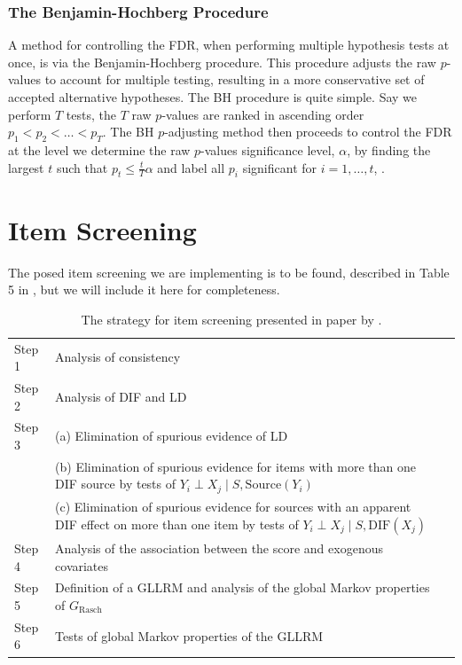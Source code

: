 \documentclass[a4project,12pt]{article}
\theoremstyle{examplestyle}
\theoremstyle{defstyle}
\theoremstyle{thmstyle}
\begin{document}
\subsubsection{The Benjamin-Hochberg Procedure}
A method for controlling the FDR, when performing multiple hypothesis tests at once, is via the Benjamin-Hochberg procedure. This procedure adjusts the raw $p$-values to account for multiple testing, resulting in a more conservative set of accepted alternative hypotheses. The BH procedure is quite simple. Say we perform $T$ tests, the $T$ raw $p$-values are ranked in ascending order $p_1<p_2<\dots <p_T$. The BH $p$-adjusting method then proceeds to control the FDR at the level we determine the raw $p$-values significance level, $\alpha$, by finding the largest $t$ such that $p_t\leq \frac{t}{T}\alpha$ and label all $p_i$ significant for $i=1,\dots,t$, \cite{BenjaminiHochberg2013}.


\section{Item Screening}\label{sec:it_sec}
The posed item screening we are implementing is to be found, described in Table 5 in \cite{Kreiner_Christensen_2011}, but we will include it here for completeness.

\begin{table}[ht]
\centering
\renewcommand{\arraystretch}{1.3}
\begin{tabular}{@{}p{1.5cm}p{11cm}p{3cm}@{}}
\toprule
Step 1 &
Analysis of consistency \\
Step 2 &
Analysis of DIF and LD  \\
Step 3 &
(a) Elimination of spurious evidence of LD \\
&
(b) Elimination of spurious evidence for items with more than one
DIF source by tests of
$Y_i \perp X_j \mid S,\mathrm{Source}(Y_i)$ \\
&
(c) Elimination of spurious evidence for sources with an apparent
DIF effect on more than one item by tests of
$Y_i \perp X_j \mid S,\mathrm{DIF}(X_j)$ \\
Step 4 &
Analysis of the association between the score and exogenous covariates \\
Step 5 &
Definition of a GLLRM and analysis of the global Markov properties
of $G_{\mathrm{Rasch}}$\\
Step 6 &
Tests of global Markov properties of the GLLRM \\
\bottomrule
\end{tabular}
\caption{The strategy for item screening presented in paper by \cite{Kreiner_Christensen_2011}.}
\label{tab:item_screening_guide}
\end{table}
\end{document}
